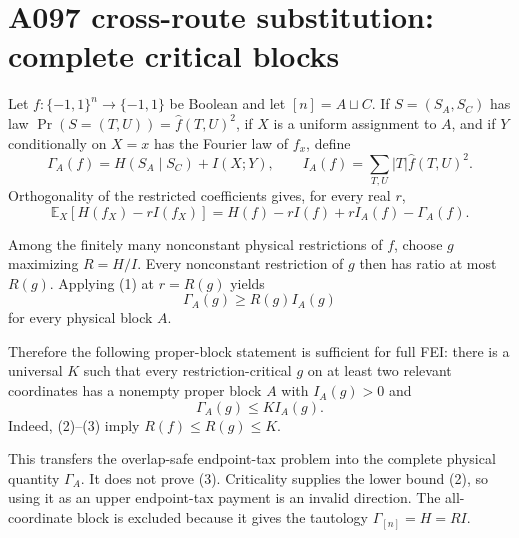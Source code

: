 \section*{A097 cross-route substitution: complete critical blocks}

Let $f:\{-1,1\}^n\to\{-1,1\}$ be Boolean and let
$[n]=A\sqcup C$.  If $S=(S_A,S_C)$ has law
$\Pr(S=(T,U))=\widehat f(T,U)^2$, if $X$ is a uniform assignment to
$A$, and if $Y$ conditionally on $X=x$ has the Fourier law of $f_x$, define
\[
 \Gamma_A(f)=H(S_A\mid S_C)+I(X;Y),\qquad
 I_A(f)=\sum_{T,U}|T|\widehat f(T,U)^2.
\]
Orthogonality of the restricted coefficients gives, for every real $r$,
\[
 \mathbb E_X[H(f_X)-rI(f_X)]
 =H(f)-rI(f)+rI_A(f)-\Gamma_A(f).                 \tag{1}
\]

Among the finitely many nonconstant physical restrictions of $f$, choose
$g$ maximizing $R=H/I$.  Every nonconstant restriction of $g$ then has
ratio at most $R(g)$.  Applying (1) at $r=R(g)$ yields
\[
 \Gamma_A(g)\ge R(g)I_A(g)                       \tag{2}
\]
for every physical block $A$.

Therefore the following proper-block statement is sufficient for full FEI:
there is a universal $K$ such that every restriction-critical $g$ on at
least two relevant coordinates has a nonempty proper block $A$ with
$I_A(g)>0$ and
\[
 \Gamma_A(g)\le K I_A(g).                         \tag{3}
\]
Indeed, (2)--(3) imply $R(f)\le R(g)\le K$.

This transfers the overlap-safe endpoint-tax problem into the complete
physical quantity $\Gamma_A$.  It does not prove (3).  Criticality supplies
the lower bound (2), so using it as an upper endpoint-tax payment is an
invalid direction.  The all-coordinate block is excluded because it gives
the tautology $\Gamma_{[n]}=H=RI$.
